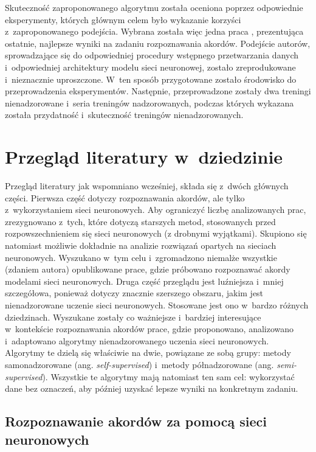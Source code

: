 Skuteczność zaproponowanego algorytmu została oceniona poprzez odpowiednie eksperymenty, których głównym celem było wykazanie korzyści z~zaproponowanego podejścia. Wybrana została więc jedna praca \cite{park_bi-directional_2019}, prezentująca ostatnie, najlepsze wyniki na zadaniu rozpoznawania akordów. Podejście autorów, sprowadzające się do odpowiedniej procedury wstępnego przetwarzania danych i~odpowiedniej architektury modelu sieci neuronowej, zostało zreprodukowane i~nieznacznie uproszczone. W~ten sposób przygotowane zostało środowisko do przeprowadzenia eksperymentów. Następnie, przeprowadzone zostały dwa treningi nienadzorowane i~seria treningów nadzorowanych, podczas których wykazana została przydatność i~skuteczność treningów nienadzorowanych.



\section{Przegląd literatury w~dziedzinie}

Przegląd literatury jak wspomniano wcześniej, składa się z~dwóch głównych części. Pierwsza część dotyczy rozpoznawania akordów, ale tylko z~wykorzystaniem sieci neuronowych. Aby ograniczyć liczbę analizowanych prac, zrezygnowano z~tych, które dotyczą starszych metod, stosowanych przed rozpowszechnieniem się sieci neuronowych (z drobnymi wyjątkami). Skupiono się natomiast możliwie dokładnie na analizie rozwiązań opartych na sieciach neuronowych. Wyszukano w~tym celu i~zgromadzono niemalże wszystkie (zdaniem autora) opublikowane prace, gdzie próbowano rozpoznawać akordy modelami sieci neuronowych. Druga część przeglądu jest luźniejsza i~mniej szczegółowa, ponieważ dotyczy znacznie szerszego obszaru, jakim jest nienadzorowane uczenie sieci neuronowych. Stosowane jest ono w~bardzo różnych dziedzinach. Wyszukane zostały co ważniejsze i~bardziej interesujące w~kontekście rozpoznawania akordów prace, gdzie proponowano, analizowano i~adaptowano algorytmy nienadzorowanego uczenia sieci neuronowych. Algorytmy te dzielą się właściwie na dwie, powiązane ze sobą grupy: metody samonadzorowane (ang. \emph{self-supervised}) i~metody półnadzorowane (ang. \emph{semi-supervised}). Wszystkie te algorytmy mają natomiast ten sam cel: wykorzystać dane bez oznaczeń, aby później uzyskać lepsze wyniki na konkretnym zadaniu.

\subsection{Rozpoznawanie akordów za pomocą sieci neuronowych}

